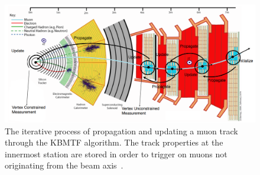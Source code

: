\begin{figure} [htb!]
	\centering
	\includegraphics[width=0.85\linewidth]{figs/04_muons/kbmtf_diagram.png}
	\caption[The iterative process of propagation and updating a muon track through the KBMTF algorithm. The track properties at the innermost station are stored in order to trigger on muons not originating from the beam axis.]
	{The iterative process of propagation and updating a muon track through the KBMTF algorithm. The track properties at the innermost station are stored in order to trigger on muons not originating from the beam axis~\cite{CERN-LHCC-2020-004}.}
	\label{fig:kbmtf}
\end{figure}

